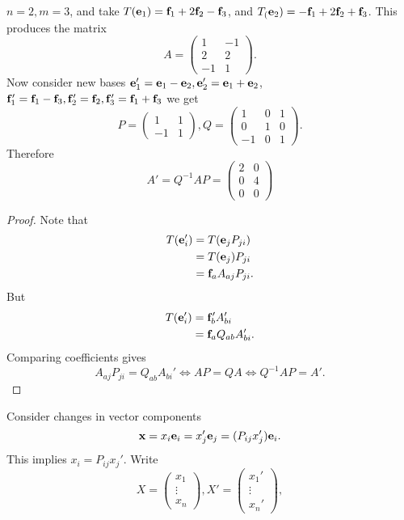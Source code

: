 \documentclass[10pt]{article}
\begin{document}
    \begin{example}
        $n=2,m=3$, and take $ T({\bf e}_1) = {\bf f}_1+2{\bf f}_2-{\bf f}_3 $, and $ T_({\bf e}_2)=-{\bf f}_1+2{\bf f}_2+{\bf f}_3 $. This produces the matrix 
        \[
            A=\begin{pmatrix}
                1&-1\\
                2&2\\
                -1&1
            \end{pmatrix}.
        \]
        Now consider new bases $ {\bf e}_1'={\bf e}_1-{\bf e}_2, {\bf e}_2'={\bf e}_1+{\bf e}_2 $, $ {\bf f}_1'= {\bf f}_1-{\bf f}_3, {\bf f}_2'={\bf f}_2, {\bf f}_3'={\bf f}_1+{\bf f}_3$ we get 
        \[
            P=\begin{pmatrix}
                1&1\\
                -1&1
            \end{pmatrix},
            Q=\begin{pmatrix}
                1&0&1\\
                0&1&0\\
                -1&0&1
            \end{pmatrix}.
        \]
        Therefore 
        \[
            A'=Q^{-1}AP=\begin{pmatrix}
                2&0\\
                0&4\\
                0&0
            \end{pmatrix}
        \]
    \end{example}
    \begin{proof}
        Note that 
        \begin{align*}
            T({\bf e}_i')&= T({\bf e}_jP_{ji})\\
            &=T({\bf e}_j)P_{ji}\\
            &= {\bf f}_aA_{aj}P_{ji}.
        \end{align*}
        But
        \begin{align*}
            T({\bf e}_i')&= {\bf f}_b' A_{bi}'\\
            &= {\bf f}_aQ_{ab}A_{bi}'.
        \end{align*}
        Comparing coefficients gives
        \[
            A_{aj}P_{ji}=Q_{ab}A_{bi}' \Longleftrightarrow AP=QA \Longleftrightarrow Q^{-1}AP=A'.
        \]
    \end{proof}
    Consider changes in vector components 
    \[
        {\bf x} = x_i{\bf e}_i = x_j'{\bf e}_j = (P_{ij}x_j'){\bf e}_i.
    \]
    This implies $ x_i=P_{ij}x_j' $. Write 
    \[
        X = \begin{pmatrix}
            x_1\\\vdots \\x_n
        \end{pmatrix}, X'=\begin{pmatrix}
            x_1'\\\vdots \\x_n'
        \end{pmatrix},
    \]
\end{document}

